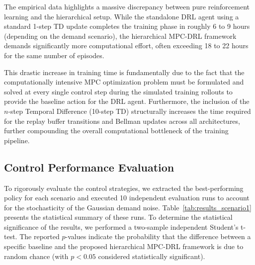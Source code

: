 The empirical data highlights a massive discrepancy between pure reinforcement learning and the hierarchical setup. While the standalone DRL agent using a standard 1-step TD update completes the training phase in roughly 6 to 9 hours (depending on the demand scenario), the hierarchical MPC-DRL framework demands significantly more computational effort, often exceeding 18 to 22 hours for the same number of episodes. 

This drastic increase in training time is fundamentally due to the fact that the computationally intensive MPC optimization problem must be formulated and solved at every single control step during the simulated training rollouts to provide the baseline action for the DRL agent. Furthermore, the inclusion of the $n$-step Temporal Difference (10-step TD) structurally increases the time required for the replay buffer transitions and Bellman updates across all architectures, further compounding the overall computational bottleneck of the training pipeline.

\subsection{Control Performance Evaluation}

To rigorously evaluate the control strategies, we extracted the best-performing policy for each scenario and executed 10 independent evaluation runs to account for the stochasticity of the Gaussian demand noise. Table~\ref{tab:results_scenario1} presents the statistical summary of these runs. To determine the statistical significance of the results, we performed a two-sample independent Student's t-test. The reported $p$-values indicate the probability that the difference between a specific baseline and the proposed hierarchical MPC-DRL framework is due to random chance (with $p < 0.05$ considered statistically significant).

